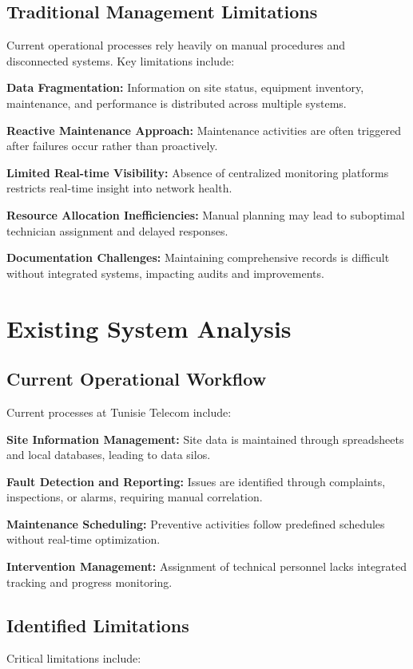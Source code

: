 \subsection{Traditional Management Limitations}
Current operational processes rely heavily on manual procedures and disconnected systems. Key limitations include:

\textbf{Data Fragmentation:} Information on site status, equipment inventory, maintenance, and performance is distributed across multiple systems.

\textbf{Reactive Maintenance Approach:} Maintenance activities are often triggered after failures occur rather than proactively.

\textbf{Limited Real-time Visibility:} Absence of centralized monitoring platforms restricts real-time insight into network health.

\textbf{Resource Allocation Inefficiencies:} Manual planning may lead to suboptimal technician assignment and delayed responses.

\textbf{Documentation Challenges:} Maintaining comprehensive records is difficult without integrated systems, impacting audits and improvements.

\section{Existing System Analysis}

\subsection{Current Operational Workflow}
Current processes at Tunisie Telecom include:

\textbf{Site Information Management:} Site data is maintained through spreadsheets and local databases, leading to data silos.

\textbf{Fault Detection and Reporting:} Issues are identified through complaints, inspections, or alarms, requiring manual correlation.

\textbf{Maintenance Scheduling:} Preventive activities follow predefined schedules without real-time optimization.

\textbf{Intervention Management:} Assignment of technical personnel lacks integrated tracking and progress monitoring.

\subsection{Identified Limitations}
Critical limitations include:

